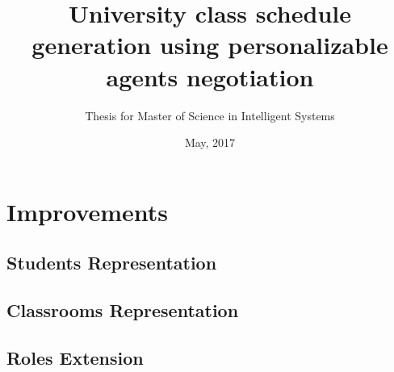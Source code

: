 \documentclass{beamer}
\title{University class schedule generation using personalizable agents negotiation}
\subtitle{Thesis for Master of Science in Intelligent Systems}
\institute[ITESM]{Tecnol\'{o}gico de Monterrey}
\date{May, 2017}
\begin{document}
\frame{\titlepage}











\section{Improvements}
\subsection{Students Representation}
\subsection{Classrooms Representation}
\subsection{Roles Extension}
\end{document}
